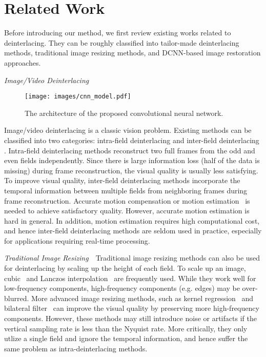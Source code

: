 \documentclass[acmtog]{acmart}
\begin{document}
 \section{Related Work}
Before introducing our method, we first review existing works related to 
deinterlacing. They can be roughly classified into tailor-made 
deinterlacing methods,  traditional image resizing methods, and DCNN-based
image restoration approaches.

\vspace{0.15in}
\noindent\emph{Image/Video Deinterlacing}\,\,\,\,
\begin{figure*}[!tp]
\texttt{[image: images/cnn\_model.pdf]}\\
  \caption{The architecture of the proposed convolutional neural network.}\label{fig:cnn_model}
\end{figure*}
Image/video deinterlacing is a classic  vision problem. 
Existing methods can be classified into two categories: intra-field deinterlacing
\cite{doyle1990interlaced,wang2012efficient,wang2013moving} and inter-field
deinterlacing \cite{jeon2009weighted,mohammadi2012enhanced,lee2013high}. 
Intra-field deinterlacing methods reconstruct two full frames from the odd and even fields
independently. Since
there is large information loss (half of the data is missing) during frame
reconstruction, the visual quality is usually less satisfying. To improve visual
quality, inter-field deinterlacing methods incorporate the temporal
information between multiple fields from neighboring frames during frame
reconstruction. Accurate motion compensation or motion
estimation~\cite{horn1981determining} is needed to achieve satisfactory quality. However, 
accurate motion estimation is hard in general. In
addition, motion estimation requires high computational cost, and hence inter-field
deinterlacing methods are seldom used in practice, especially for applications
requiring real-time processing.

\vspace{0.15in}
\noindent\emph{Traditional Image Resizing}\,\,\,\,
Traditional image resizing
methods can also be used for deinterlacing by scaling up the height of each field.
To scale up an image, cubic~\cite{mitchell1988reconstruction} and
Lanczos interpolation~\cite{duchon1979lanczos} are frequently used. While they work well for low-frequency components, high-frequency components 
(e.g. edges) may be over-blurred. More advanced image resizing methods, 
such as kernel regression~\cite{takeda2007kernel} and
bilateral filter~\cite{hung2012fast} can improve the
visual quality by preserving more high-frequency components. 
However, these methods may still introduce noise or artifacts 
if the vertical sampling rate is less than the Nyquist rate. 
More critically, they only utlize a single field and ignore the temporal information, 
and hence suffer the same problem as intra-deinterlacing methods.
\end{document}
